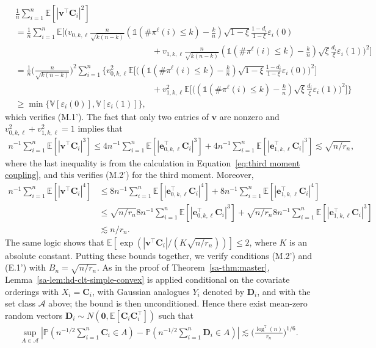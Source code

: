 \documentclass[10pt]{article}
\def\be{\mathbf{e}}
\def\bv{\mathbf{v}}
\def\bC{\mathbf{C}}
\def\bD{\mathbf{D}}
\def\bD{\boldsymbol{D}}
\def\E{\mathbb{E}}
\def\P{\mathbb{P}}
\def\V{\mathbb{V}}
\newcommand{\Indicator}{\mathds{1}}
\theoremstyle{definition}
\theoremstyle{remark}
\begin{document}
\begin{align*}
   & \frac{1}{n}\sum_{i = 1}^n \E[|\bv^\top \bC_i|^2] \\
    & = \frac{1}{n} \sum_{i = 1}^n \E \bigg[\bigg(v_{0,k,\ell} \frac{n}{\sqrt{k (n - k)}}(\Indicator(\#\pi^{\ell}(i) \leq k) - \frac{k}{n})\sqrt{1-\xi}\frac{1 - d_i}{1 - \xi} \varepsilon_i(0) \\
    & \qquad \qquad  \qquad \qquad \qquad \qquad \qquad\qquad+ v_{1,k,\ell} \frac{n}{\sqrt{k (n - k)}}(\Indicator(\#\pi^{\ell}(i) \leq k) - \frac{k}{n})\sqrt{\xi}\frac{d_i}{\xi} \varepsilon_i(1)\bigg)^2\bigg] \\
    & = \frac{1}{n}\bigg(\frac{n}{\sqrt{k (n - k)}}\bigg)^2\sum_{i =1}^n \bigg\{v_{0,k,\ell}^2 \E \bigg[\bigg((\Indicator(\#\pi^{\ell}(i) \leq k) - \frac{k}{n})\sqrt{1-\xi}\frac{1 - d_i}{1 - \xi} \varepsilon_i(0) \bigg)^2 \bigg] \\
    & \qquad \qquad \qquad \qquad \qquad \qquad \qquad \qquad + v_{1,k,\ell}^2 \E \bigg[\bigg((\Indicator(\#\pi^{\ell}(i) \leq k) - \frac{k}{n})\sqrt{\xi}\frac{d_i}{\xi} \varepsilon_i(1) \bigg)^2 \bigg] \bigg\} \\
    & \geq \min \{\V[\varepsilon_i(0)], \V[\varepsilon_i(1)]\},
\end{align*}
which verifies (M.1'). The fact that only two entries of $\mathbf{v}$ are nonzero and $v_{0,k,\ell}^2 + v_{1,k,\ell}^2 = 1$ implies that
\begin{align*}
    n^{-1}\sum_{i = 1}^n \E[|\bv^\top \bC_i|^3] \leq 4 n^{-1}\sum_{i = 1}^n \E[|\be_{0,k,\ell}^\top \bC_i|^3] + 4 n^{-1}\sum_{i = 1}^n \E[|\be_{1,k,\ell}^\top \bC_i|^3] \lesssim \sqrt{n / r_n},
\end{align*}
where the last inequality is from the calculation in Equation~\eqref{eq:third moment coupling}, and this verifies (M.2') for the third moment. Moreover,
\begin{align*}
    n^{-1}\sum_{i = 1}^n \E[|\bv^\top \bC_i|^4] 
    & \leq 8 n^{-1}\sum_{i = 1}^n \E[|\be_{0,k,\ell}^\top \bC_i|^4] + 8 n^{-1}\sum_{i = 1}^n \E[|\be_{1,k,\ell}^\top \bC_i|^4] \\
    & \leq \sqrt{n / r_n} 8 n^{-1}\sum_{i = 1}^n \E[|\be_{0,k,\ell}^\top \bC_i|^3] + \sqrt{n / r_n} 8 n^{-1}\sum_{i = 1}^n \E[|\be_{1,k,\ell}^\top \bC_i|^3] \\
    & \lesssim n / r_n.
\end{align*}
The same logic shows that $\E[\exp(|\mathbf{v}^\top \bC_i|/(K\sqrt{n / r_n}))] \leq 2$, where $K$ is an absolute constant. Putting these bounds together, we verify conditions (M.2') and (E.1') with $B_n = \sqrt{n / r_n}$. As in the proof of Theorem~\ref{sa-thm:master}, Lemma~\ref{sa-lem:hd-clt-simple-convex} is applied conditional on the covariate orderings with $X_i=\bC_i$, with Gaussian analogues $Y_i$ denoted by $\bD_i$, and with the set class $\mathcal A$ above; the bound is then unconditioned. Hence there exist mean-zero random vectors $\bD_i \sim N(\mathbf{0}, \E[\bC_i \bC_i^\top])$ such that
\begin{align}\label{eq:fit-clt}
    \sup_{A \in \mathcal{A}} |\P(n^{-1/2}\sum_{i = 1}^n \bC_i \in A) - \P(n^{-1/2} \sum_{i =1}^n \bD_i \in A)| \lesssim \bigg(\frac{\log^7(n)}{r_n}\bigg)^{1/6}.
\end{align}
\end{document}
